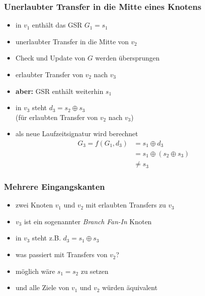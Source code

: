 \documentclass[mathserif,slidestop,compress,red]{beamer}
\begin{document}
\begin{frame}
  \frametitle{Unerlaubter Transfer in die Mitte eines Knotens}
  \begin{itemize}
    \pause
    \item in $v_1$ enthält das GSR $G_1 = s_1$
    \pause
    \item unerlaubter Transfer in die Mitte von $v_2$
    \pause
    \item Check und Update von $G$ werden übersprungen
    \pause
    \item erlaubter Transfer von $v_2$ nach $v_3$
    \item \textbf{aber:} GSR enthält weiterhin $s_1$
    \pause
    \item in $v_3$ steht $d_3 = s_2 \oplus s_3$ \\
          (für erlaubten Transfer von $v_2$ nach $v_3$)
    \pause
    \item als neue Laufzeitsignatur wird berechnet
    \begin{align*}
    G_3 = f(G_1, d_3) &= s_1 \oplus d_3 \\
    &= s_1 \oplus ( s_2 \oplus s_3 ) \\
    &\neq s_3
    \end{align*}
  \end{itemize}
\end{frame}

\begin{frame}
  \frametitle{Mehrere Eingangskanten}
  \begin{itemize}
    \item zwei Knoten $v_1$ und $v_2$ mit erlaubten Transfers zu $v_3$
    \item $v_3$ ist ein sogenannter \emph{Branch Fan-In} Knoten
    \item in $v_3$ steht z.B. $d_3 = s_1 \oplus s_3$
    \item was passiert mit Transfers von $v_2$?
    \vspace{1em}
    \pause
    \item möglich wäre $s_1 = s_2$ zu setzen
    \pause
    \item und alle Ziele von $v_1$ und $v_2$ würden äquivalent
  \end{itemize}
\end{frame}
\end{document}
